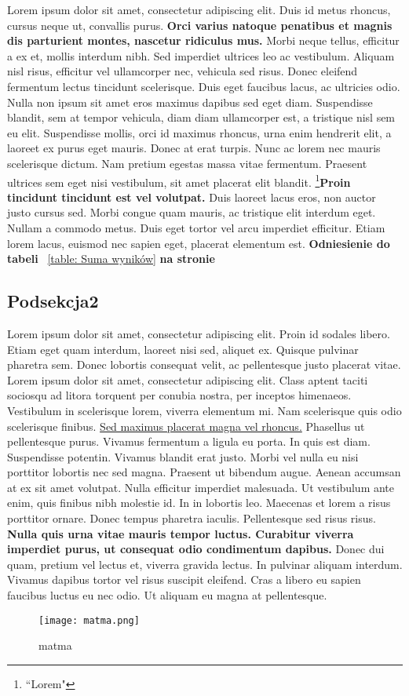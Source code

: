 \documentclass[12pt,a4paper]{article}
\begin{document}
	Lorem ipsum dolor sit amet, consectetur adipiscing elit. Duis id metus rhoncus, cursus neque ut, convallis purus. \textbf{Orci varius natoque penatibus et magnis dis parturient montes, nascetur ridiculus mus.} Morbi neque tellus, efficitur a ex et, mollis interdum nibh. Sed imperdiet ultrices leo ac vestibulum. Aliquam nisl risus, efficitur vel ullamcorper nec, vehicula sed risus. Donec eleifend fermentum lectus tincidunt scelerisque. Duis eget faucibus lacus, ac ultricies odio. Nulla non ipsum sit amet eros maximus dapibus sed eget diam. Suspendisse blandit, sem at tempor vehicula, diam diam ullamcorper est, a tristique nisl sem eu elit. Suspendisse mollis, orci id maximus rhoncus, urna enim hendrerit elit, a laoreet ex purus eget mauris. Donec at erat turpis. Nunc ac lorem nec mauris scelerisque dictum. Nam pretium egestas massa vitae fermentum. Praesent ultrices sem eget nisi vestibulum, sit amet placerat elit blandit. \footnote{``Lorem"}\textbf{Proin tincidunt tincidunt est vel volutpat.} \cite{ref4}Duis laoreet lacus eros, non auctor justo cursus sed. Morbi congue quam mauris, ac tristique elit interdum eget. Nullam a commodo metus. Duis eget tortor vel arcu imperdiet efficitur. Etiam lorem lacus, euismod nec sapien eget, placerat elementum est.  \textbf{Odniesienie do tabeli} ~\ref{table: Suma wyników} \textbf{na stronie} ~\pageref{table: Suma wyników} 

	
	\subsection{Podsekcja2}
	Lorem ipsum dolor sit amet, consectetur adipiscing elit. Proin id sodales libero. Etiam eget quam interdum, laoreet nisi sed, aliquet ex. Quisque pulvinar pharetra sem. Donec lobortis consequat velit, ac pellentesque justo placerat vitae. Lorem ipsum dolor sit amet, consectetur adipiscing elit. Class aptent taciti sociosqu ad litora torquent per conubia nostra, per inceptos himenaeos. Vestibulum in scelerisque lorem, viverra elementum mi. Nam scelerisque quis odio scelerisque finibus. \underline{Sed maximus placerat magna vel rhoncus.} Phasellus ut pellentesque purus. Vivamus fermentum a ligula eu porta. In quis est diam. Suspendisse potentin. Vivamus blandit erat justo. Morbi vel nulla eu nisi porttitor lobortis nec sed magna. Praesent ut bibendum augue. \cite{ref5}Aenean accumsan at ex sit amet volutpat. Nulla efficitur imperdiet malesuada. Ut vestibulum ante enim, quis finibus nibh molestie id. In in lobortis leo. Maecenas et lorem a risus porttitor ornare. Donec tempus pharetra iaculis. Pellentesque sed risus risus.\textbf{ Nulla quis urna vitae mauris tempor luctus. Curabitur viverra imperdiet purus, ut consequat odio condimentum dapibus.} Donec dui quam, pretium vel lectus et, viverra gravida lectus. In pulvinar aliquam interdum. Vivamus dapibus tortor vel risus suscipit eleifend. Cras a libero eu sapien faucibus luctus eu nec odio. Ut aliquam eu magna at pellentesque. 
	\begin{figure}[H]
		\centering
		\texttt{[image: matma.png]}
		\caption{matma}
		\label{fig: matma}
	\end{figure}
\end{document}
